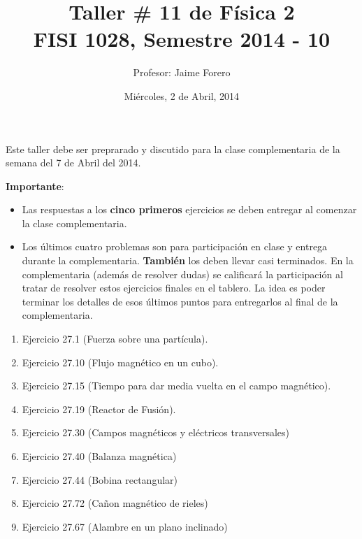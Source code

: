 \documentclass{article}
\title{Taller \# 11 de F\'isica 2\\ FISI 1028, Semestre 2014 - 10}
\author{Profesor: Jaime Forero}
\date{Mi\'ercoles, 2 de Abril, 2014}
\begin{document}
\maketitle
\thispagestyle{empty}

\noindent

Este taller debe ser preprarado y discutido para la clase
complementaria de la semana del 7 de Abril del 2014. 

\noindent
{\bf Importante}:
\begin{itemize}

\item
Las respuestas a los {\bf cinco primeros} ejercicios se deben entregar
al comenzar la clase complementaria. 
\item 

Los \'ultimos cuatro problemas son para participaci\'on en clase y entrega
durante la complementaria. {\bf{Tambi\'en}} los deben llevar casi
terminados. En la complementaria (adem\'as de resolver dudas) se
calificar\'a la participaci\'on al tratar de resolver estos ejercicios
finales en el tablero. La idea es poder terminar los  detalles de esos
\'ultimos puntos para entregarlos al final de la complementaria.
\end{itemize}

\begin{enumerate}

\item
Ejercicio 27.1 (Fuerza sobre una part\'icula).

\item
Ejercicio 27.10 (Flujo magn\'etico en un cubo).

\item 
Ejercicio 27.15 (Tiempo para dar media vuelta en el campo magn\'etico).

\item 
Ejercicio 27.19 (Reactor de Fusi\'on).

\item
Ejercicio 27.30 (Campos magn\'eticos y el\'ectricos transversales)

\item 
Ejercicio 27.40 (Balanza magn\'etica)
\item
Ejercicio 27.44 (Bobina rectangular)

\item
Ejercicio 27.72 (Cañon magn\'etico de rieles)

\item
Ejercicio 27.67 (Alambre en un plano inclinado)

\end{enumerate}
\end{document}
